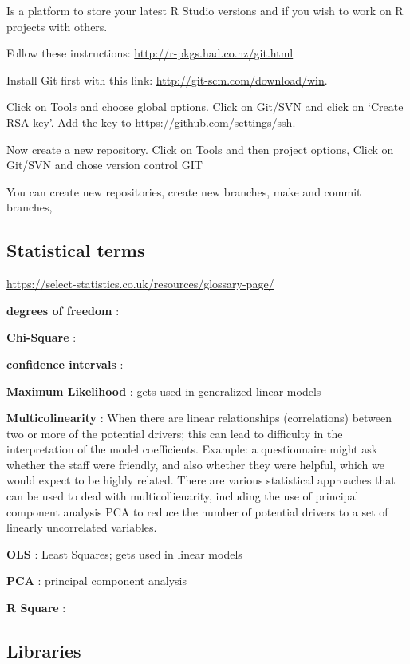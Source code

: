 \documentclass[]{article}
\begin{document}
Is a platform to store your latest R Studio versions and if you wish to
work on R projects with others.

Follow these instructions: \url{http://r-pkgs.had.co.nz/git.html}

Install Git first with this link: \url{http://git-scm.com/download/win}.

Click on Tools and choose global options. Click on Git/SVN and click on
`Create RSA key'. Add the key to \url{https://github.com/settings/ssh}.

Now create a new repository. Click on Tools and then project options,
Click on Git/SVN and chose version control GIT

You can create new repositories, create new branches, make and commit
branches,

\subsection{Statistical terms}\label{statistical-terms}

\url{https://select-statistics.co.uk/resources/glossary-page/}

\textbf{degrees of freedom} :

\textbf{Chi-Square} :

\textbf{confidence intervals} :

\textbf{Maximum Likelihood} : gets used in generalized linear models

\textbf{Multicolinearity} : When there are linear relationships
(correlations) between two or more of the potential drivers; this can
lead to difficulty in the interpretation of the model coefficients.
Example: a questionnaire might ask whether the staff were friendly, and
also whether they were helpful, which we would expect to be highly
related. There are various statistical approaches that can be used to
deal with multicollienarity, including the use of principal component
analysis PCA to reduce the number of potential drivers to a set of
linearly uncorrelated variables.

\textbf{OLS} : Least Squares; gets used in linear models

\textbf{PCA} : principal component analysis

\textbf{R Square} :

\subsection{Libraries}\label{libraries}
\end{document}
